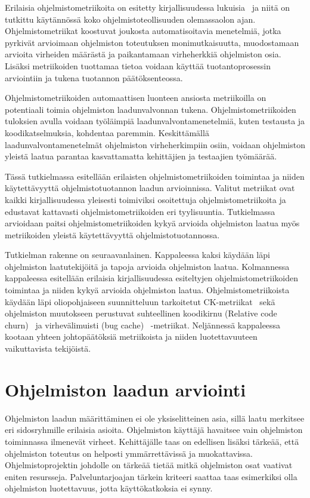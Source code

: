 \documentclass[finnish]{tktltiki2}
\theoremstyle{definition}
\theoremstyle{remark}
\begin{document}
Erilaisia ohjelmistometriikoita on esitetty kirjallisuudessa lukuisia~\cite{M76, H77, CK94, GKMS00, ZN08} ja niitä on tutkittu käytännössä koko ohjelmistoteollisuuden olemassaolon ajan. Ohjelmistometriikat koostuvat joukosta automatisoitavia menetelmiä, jotka pyrkivät arvioimaan ohjelmiston toteutuksen monimutkaisuutta, muodostamaan arvioita virheiden määrästä ja paikantamaan virheherkkiä ohjelmiston osia. Lisäksi metriikoiden tuottamaa tietoa voidaan käyttää tuotantoprosessin arviointiin ja tukena tuotannon päätöksenteossa.

Ohjelmistometriikoiden automaattisen luonteen ansiosta metriikoilla on potentiaali toimia ohjelmiston laadunvalvonnan tukena. Ohjelmistometriikoiden tuloksien avulla voidaan työläimpiä laadunvalvontamenetelmiä, kuten testausta ja koodikatselmuksia, kohdentaa paremmin. Keskittämällä laadunvalvontamenetelmät ohjelmiston virheherkimpiin osiin, voidaan ohjelmiston yleistä laatua parantaa kasvattamatta kehittäjien ja testaajien työmäärää.

Tässä tutkielmassa esitellään erilaisten ohjelmistometriikoiden toimintaa ja niiden käytettävyyttä ohjelmistotuotannon laadun arvioinnissa. Valitut metriikat ovat kaikki kirjallisuudessa yleisesti toimiviksi osoitettuja ohjelmistometriikoita ja edustavat kattavasti ohjelmistometriikoiden eri tyylisuuntia. Tutkielmassa arvioidaan paitsi ohjelmistometriikoiden kykyä arvioida ohjelmiston laatua myös metriikoiden yleistä käytettävyyttä ohjelmistotuotannossa.

Tutkielman rakenne on seuraavanlainen. Kappaleessa kaksi käydään läpi ohjelmiston laatutekijöitä ja tapoja arvioida ohjelmiston laatua. Kolmannessa kappaleessa esitellään erilaisia kirjallisuudessa esiteltyjen ohjelmistometriikoiden toimintaa ja niiden kykyä arvioida ohjelmiston laatua. Ohjelmistometriikoista käydään läpi oliopohjaiseen suunnitteluun tarkoitetut CK-metriikat~\cite{CK91, CK94} sekä ohjelmiston muutokseen perustuvat suhteellinen koodikirnu (Relative code churn)~\cite{NB05} ja virhevälimuisti (bug cache)~\cite{KZWZ07} -metriikat. Neljännessä kappaleessa kootaan yhteen johtopäätöksiä metriikoista ja niiden luotettavuuteen vaikuttavista tekijöistä.

\section{Ohjelmiston laadun arviointi}

Ohjelmiston laadun määrittäminen ei ole yksiselitteinen asia, sillä laatu merkitsee eri sidosryhmille erilaisia asioita. Ohjelmiston käyttäjä havaitsee vain ohjelmiston toiminnassa ilmenevät virheet. Kehittäjälle taas on edellisen lisäksi tärkeää, että ohjelmiston toteutus on helposti ymmärrettävissä ja muokattavissa. Ohjelmistoprojektin johdolle on tärkeää tietää mitkä ohjelmiston osat vaativat eniten resursseja. Palveluntarjoajan tärkein kriteeri saattaa taas esimerkiksi olla ohjelmiston luotettavuus, jotta käyttökatkoksia ei synny.
\end{document}
